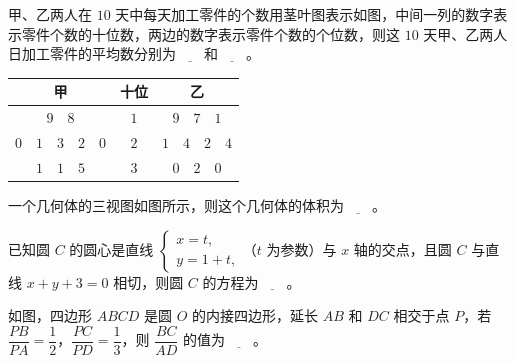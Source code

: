 \begin{question}
甲、乙两人在 $10$ 天中每天加工零件的个数用茎叶图表示如图，中间一列的数字表示零件个数的十位数，两边的数字表示零件个数的个位数，则这 $10$ 天甲、乙两人日加工零件的平均数分别为$\underline{\qquad}$和$\underline{\qquad}$。

\begin{center}
\begin{tabular}{ccc}
\toprule
甲 & 十位 & 乙 \\
\midrule
$9\quad8$ & $1$ & $9\quad7\quad1$ \\
$0\quad1\quad3\quad2\quad0$ & $2$ & $1\quad4\quad2\quad4$ \\
$1\quad1\quad5$ & $3$ & $0\quad2\quad0$ \\
\bottomrule
\end{tabular}
\end{center}

\Needspace{0.4\textheight}
\end{question}
\begingroup
\renewenvironment{question}{\Needspace{0.5\textheight}}{}
\begin{question}
一个几何体的三视图如图所示，则这个几何体的体积为$\underline{\qquad}$。
\nopagebreak[4]
\begin{center}\end{center}
\nopagebreak[4]
\end{question}
\endgroup
\begin{question}
已知圆 $C$ 的圆心是直线 $\begin{cases}x=t,\\ y=1+t,\end{cases}$（$t$ 为参数）与 $x$ 轴的交点，且圆 $C$ 与直线 $x+y+3=0$ 相切，则圆 $C$ 的方程为$\underline{\qquad}$。

\Needspace{0.4\textheight}
\end{question}
\begingroup
\renewenvironment{question}{\Needspace{0.5\textheight}}{}
\begin{question}
如图，四边形 $ABCD$ 是圆 $O$ 的内接四边形，延长 $AB$ 和 $DC$ 相交于点 $P$，若 $\dfrac{PB}{PA}=\dfrac12$，$\dfrac{PC}{PD}=\dfrac13$，则 $\dfrac{BC}{AD}$ 的值为$\underline{\qquad}$。
\nopagebreak[4]
\begin{center}\end{center}
\nopagebreak[4]
\Needspace{0.4\textheight}
\end{question}
\endgroup
\begingroup
\renewenvironment{question}{\Needspace{0.5\textheight}}{}
